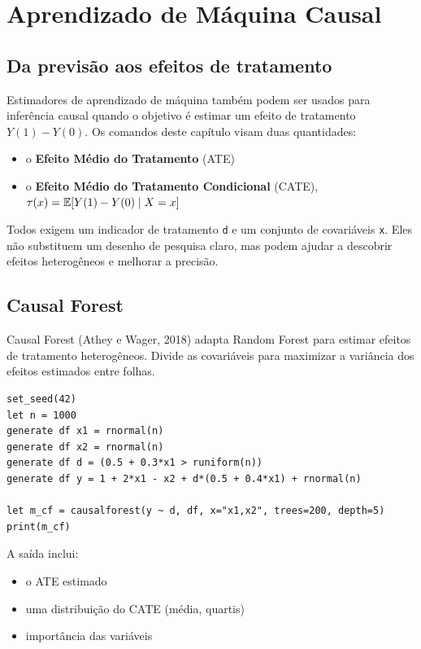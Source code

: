 \chapter{Aprendizado de Máquina Causal}

\section{Da previsão aos efeitos de tratamento}

Estimadores de aprendizado de máquina também podem ser usados para
inferência causal quando o objetivo é estimar um efeito de tratamento
$Y(1) - Y(0)$. Os comandos deste capítulo visam duas quantidades:

\begin{itemize}
\item o \textbf{Efeito Médio do Tratamento} (ATE)
\item o \textbf{Efeito Médio do Tratamento Condicional} (CATE),
      $\tau(x) = \mathbb{E}[Y(1) - Y(0) \mid X = x]$
\end{itemize}

Todos exigem um indicador de tratamento \texttt{d} e um conjunto de covariáveis
\texttt{x}. Eles não substituem um desenho de pesquisa claro, mas podem ajudar
a descobrir efeitos heterogêneos e melhorar a precisão.

\section{Causal Forest}

Causal Forest (Athey e Wager, 2018) adapta Random Forest para estimar
efeitos de tratamento heterogêneos. Divide as covariáveis para
maximizar a variância dos efeitos estimados entre folhas.

\begin{lstlisting}[caption={Causal Forest}]
set_seed(42)
let n = 1000
generate df x1 = rnormal(n)
generate df x2 = rnormal(n)
generate df d = (0.5 + 0.3*x1 > runiform(n))
generate df y = 1 + 2*x1 - x2 + d*(0.5 + 0.4*x1) + rnormal(n)

let m_cf = causalforest(y ~ d, df, x="x1,x2", trees=200, depth=5)
print(m_cf)
\end{lstlisting}

A saída inclui:

\begin{itemize}
\item o ATE estimado
\item uma distribuição do CATE (média, quartis)
\item importância das variáveis
\end{itemize}

